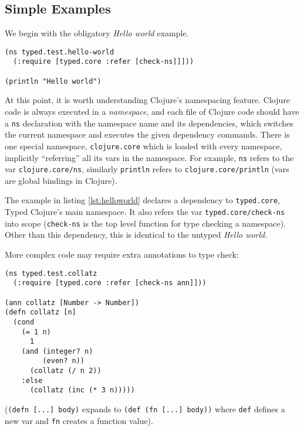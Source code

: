 \subsection{Simple Examples}

We begin with the obligatory \emph{Hello world} example.

\begin{lstlisting}[caption=Typed Hello world, label=lst:helloworld]
(ns typed.test.hello-world
  (:require [typed.core :refer [check-ns]]]))

(println "Hello world")
\end{lstlisting}

At this point, it is worth understanding Clojure's namespacing feature.
Clojure code is always executed in a \emph{namespace}, and each file of Clojure code should 
have a \lstinline|ns| declaration with the namespace name and its dependencies,
which switches the current namespace and executes the given dependency commands.
There is one special namespace, \lstinline|clojure.core| which is
loaded with every namespace, implicitly ``referring'' all its vars in the namespace.
For example, \lstinline|ns| refers to the var \lstinline|clojure.core/ns|,
similarly \lstinline|println| refers to \lstinline|clojure.core/println|
(vars are global bindings in Clojure).

The example in listing \ref{lst:helloworld} declares a dependency to 
\lstinline|typed.core|, Typed Clojure's main namespace. It also refers the var \lstinline|typed.core/check-ns|
into scope (\lstinline|check-ns| is the top level function for type checking a namespace).
Other than this dependency, this is identical to the untyped \emph{Hello world}.

More complex code may require extra annotations to type check:

\begin{lstlisting}[caption=Annotating vars in Typed Clojure (adapted from a Typed Scheme/Racket example by Tobin-Hochstadt~\cite{Tob10})]
(ns typed.test.collatz
  (:require [typed.core :refer [check-ns ann]]))

(ann collatz [Number -> Number])
(defn collatz [n]
  (cond
    (= 1 n) 
      1
    (and (integer? n) 
         (even? n)) 
      (collatz (/ n 2))
    :else 
      (collatz (inc (* 3 n)))))
\end{lstlisting}

(\lstinline|(defn [...] body)| expands to \lstinline|(def (fn [...] body))|
where \lstinline|def| defines a new var and \lstinline|fn| creates a function value).

